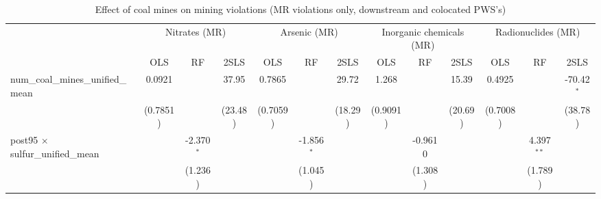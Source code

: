 
\begin{table}[htbp]
   
   \caption{\label{2sls_dwnstrmcolocate_minevio_mr} Effect of coal mines on mining violations (MR violations only, downstream and colocated PWS's)}
   \bigskip
   
   \centering
   
   \begin{adjustbox}{width = \textwidth, center}
      
      
      \begin{tabular}{lcccccccccccc}
         \toprule
         
          & \multicolumn{3}{c}{Nitrates (MR)} & \multicolumn{3}{c}{Arsenic (MR)} & \multicolumn{3}{c}{Inorganic chemicals (MR)} & \multicolumn{3}{c}{Radionuclides (MR)}\\
         
                                                                            & OLS                   & RF            & 2SLS          & OLS           & RF            & 2SLS          & OLS           & RF                    & 2SLS                  & OLS                   & RF            & 2SLS\\  
         
         \midrule 
         num\_coal\_mines\_unified\_mean                                    & 0.0921                &               & 37.95         & 0.7865        &               & 29.72         & 1.268         &                       & 15.39                 & 0.4925                &               & -70.42$^{*}$\\   
                                                                            & (0.7851)              &               & (23.48)       & (0.7059)      &               & (18.29)       & (0.9091)      &                       & (20.69)               & (0.7008)              &               & (38.78)\\   
         post95 $\times$ sulfur\_unified\_mean                              &                       & -2.370$^{*}$  &               &               & -1.856$^{*}$  &               &               & -0.9610               &                       &                       & 4.397$^{**}$  &   \\   
                                                                            &                       & (1.236)       &               &               & (1.045)       &               &               & (1.308)               &                       &                       & (1.789)       &   \\   
         

\end{tabular}
\end{adjustbox}
\end{table}

